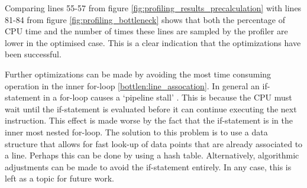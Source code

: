 Comparing lines 55-57 from figure \ref{fig:profiling_results_precalculation} with lines 81-84 from figure \ref{fig:profiling_bottleneck} shows that both the percentage of CPU time and the number of times these lines are sampled by the profiler are lower in the optimised case. This is a clear indication that the optimizations have been successful.

Further optimizations can be made by avoiding the most time consuming operation in the inner for-loop \ref{bottlen:line_assocation}. In general an if-statement in a for-loop causes a `pipeline stall' \cite[lecture 7, "Pipeline stall", slide 19]{scientific_programming}. This is because the CPU must wait until the if-statement is evaluated before it can continue executing the next instruction. This effect is made worse by the fact that the if-statement is in the inner most nested for-loop. The solution to this problem is to use a data structure that allows for fast look-up of data points that are already associated to a line. Perhaps this can be done by using a hash table. Alternatively, algorithmic adjustments can be made to avoid the if-statement entirely. In any case, this is left as a topic for future work.